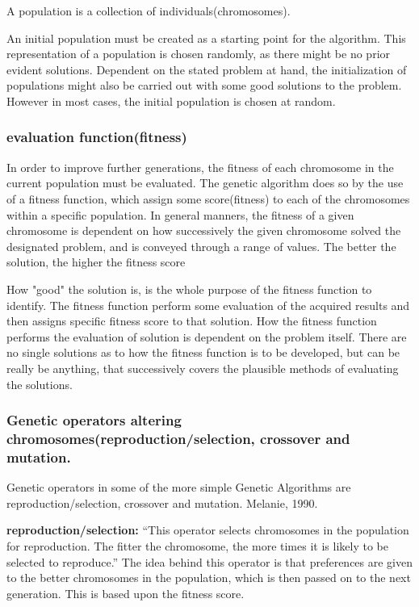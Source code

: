A population is a collection of individuals(chromosomes).

An initial population must be created as a starting point for the algorithm. This representation of a population is chosen randomly, as there might be no prior evident solutions. Dependent on the stated problem at hand, the initialization of populations might also be carried out with some good solutions to the problem. However in most cases, the initial population is chosen at random. \cite[pp. 41/42]{Sivanandam2008}


\subsubsection*{evaluation function(fitness)}

In order to improve further generations, the fitness of each chromosome in the current population must be evaluated. The genetic algorithm does so by the use of a fitness function, which assign some score(fitness) to each of the chromosomes within a specific population.
In general manners, the fitness of a given chromosome is dependent on how successively the given chromosome solved the designated problem, and is conveyed through a range of values. The better the solution, the higher the fitness score \cite[pp. 8]{Melanie1990}

How "good" the solution is, is the whole purpose of the fitness function to identify. The fitness function perform some evaluation of the acquired results and then assigns specific fitness score to that solution. How the fitness function performs the evaluation of solution is dependent on the problem itself. There are no single solutions as to how the fitness function is to be developed, but can be really be anything, that successively covers the plausible methods of evaluating the solutions. \cite[pp. 31]{Sivanandam2008}

\subsubsection*{Genetic operators altering chromosomes(reproduction/selection, crossover and mutation.}


Genetic operators in some of the more simple Genetic Algorithms are reproduction/selection, crossover and mutation. Melanie, 1990. \cite{Melanie1990}

\textbf{reproduction/selection:} \enquote{This operator selects chromosomes in the population for reproduction. The fitter the chromosome, the more times it is likely to be selected to reproduce.} \cite[pp. 8]{Melanie1990}
The idea behind this operator is that preferences are given to the better chromosomes in the population, which is then passed on to the next generation. This is based upon the fitness score.

